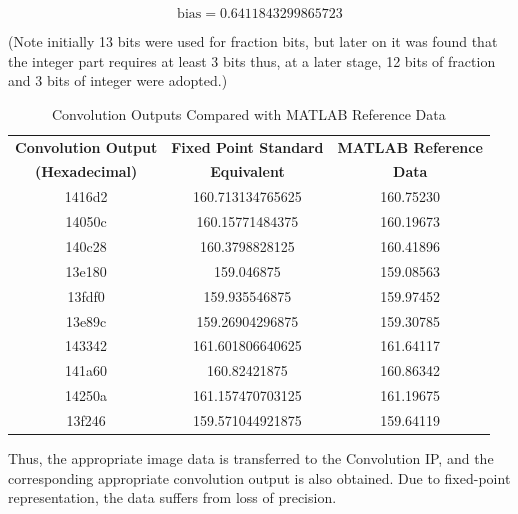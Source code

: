     \[
    \text{bias} = 0.6411843299865723
    \]
    
    \par \noindent
    (Note initially 13 bits were used for fraction bits, but later on it was found that the integer part requires at least 3 bits thus, at a later stage, 12 bits of fraction and 3 bits of integer were adopted.)

    \begin{table}[H]
    \centering
    \renewcommand{\arraystretch}{1.3} %
    \begin{tabular}{|c|c|c|}
    \hline
    \textbf{Convolution Output} & \textbf{Fixed Point Standard} & \textbf{MATLAB Reference} \\
    \textbf{(Hexadecimal)} & \textbf{Equivalent} & \textbf{Data} \\
    \hline
    1416d2 & 160.713134765625 & 160.75230 \\
    14050c & 160.15771484375  & 160.19673 \\
    140c28 & 160.3798828125   & 160.41896 \\
    13e180 & 159.046875        & 159.08563 \\
    13fdf0 & 159.935546875     & 159.97452 \\
    13e89c & 159.26904296875   & 159.30785 \\
    143342 & 161.601806640625  & 161.64117 \\
    141a60 & 160.82421875      & 160.86342 \\
    14250a & 161.157470703125  & 161.19675 \\
    13f246 & 159.571044921875  & 159.64119 \\
    \hline
    \end{tabular}
    \caption{Convolution Outputs Compared with MATLAB Reference Data}
    \label{tab:convDebugWaveform}
    \end{table}

    \noindent
    Thus, the appropriate image data is transferred to the Convolution IP, and the corresponding appropriate convolution output is also obtained. Due to fixed-point representation, the data suffers from loss of precision.

    \newpage
    
    

    

    